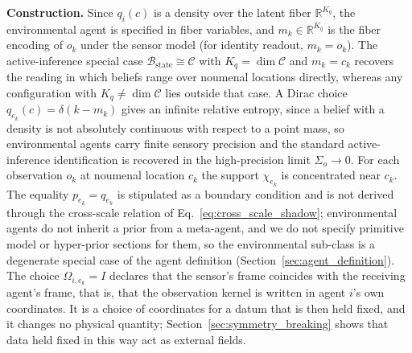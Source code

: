 \textbf{Construction.} Since $q_i(c)$ is a density over the latent fiber $\mathbb{R}^{K_q}$, the environmental agent is specified in fiber variables, and $m_k \in \mathbb{R}^{K_q}$ is the fiber encoding of $o_k$ under the sensor model (for identity readout, $m_k = o_k$). The active-inference special case $\mathcal{B}_{\mathrm{state}} \cong \mathcal{C}$ with $K_q = \dim\mathcal{C}$ and $m_k = c_k$ recovers the reading in which beliefs range over noumenal locations directly, whereas any configuration with $K_q \ne \dim\mathcal{C}$ lies outside that case. A Dirac choice $q_{e_k}(c) = \delta(k - m_k)$ gives an infinite relative entropy, since a belief with a density is not absolutely continuous with respect to a point mass, so environmental agents carry finite sensory precision and the standard active-inference identification is recovered in the high-precision limit $\Sigma_o \to 0$. For each observation $o_k$ at noumenal location $c_k$ the support $\chi_{e_k}$ is concentrated near $c_k$. The equality $p_{e_k} = q_{e_k}$ is stipulated as a boundary condition and is not derived through the cross-scale relation of Eq.~\eqref{eq:cross_scale_shadow}; environmental agents do not inherit a prior from a meta-agent, and we do not specify primitive model or hyper-prior sections for them, so the environmental sub-class is a degenerate special case of the agent definition (Section~\ref{sec:agent_definition}). The choice $\Omega_{i,e_k} = I$ declares that the sensor's frame coincides with the receiving agent's frame, that is, that the observation kernel is written in agent $i$'s own coordinates. It is a choice of coordinates for a datum that is then held fixed, and it changes no physical quantity; Section~\ref{sec:symmetry_breaking} shows that data held fixed in this way act as external fields.

